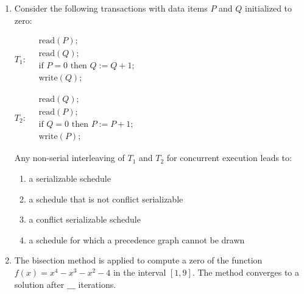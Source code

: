 \documentclass[journal]{IEEEtran}
\numberwithin{equation}{enumi}
\numberwithin{figure}{enumi}
\begin{document}
\begin{enumerate}
\begin{enumerate}
\end{enumerate}


\item Consider the following transactions with data items $P$ and $Q$ initialized to zero:

$
T_1 : \quad 
\begin{array}{l}
\text{read}(P); \\
\text{read}(Q); \\
\text{if } P = 0 \text{ then } Q := Q + 1; \\
\text{write}(Q);
\end{array}
$

$
T_2 : \quad 
\begin{array}{l}
\text{read}(Q); \\
\text{read}(P); \\
\text{if } Q = 0 \text{ then } P := P + 1; \\
\text{write}(P);
\end{array}
$

Any non-serial interleaving of $T_1$ and $T_2$ for concurrent execution leads to:

\begin{enumerate}
    \item a serializable schedule
    \item a schedule that is not conflict serializable
    \item a conflict serializable schedule
    \item a schedule for which a precedence graph cannot be drawn
\end{enumerate}

\item The bisection method is applied to compute a zero of the function
$f(x) = x^4 - x^3 - x^2 - 4$
in the interval $[1,9]$.  
The method converges to a solution after $\_\_\_$ iterations.
\begin{enumerate}
\end{enumerate}


\end{enumerate}
\end{document}

